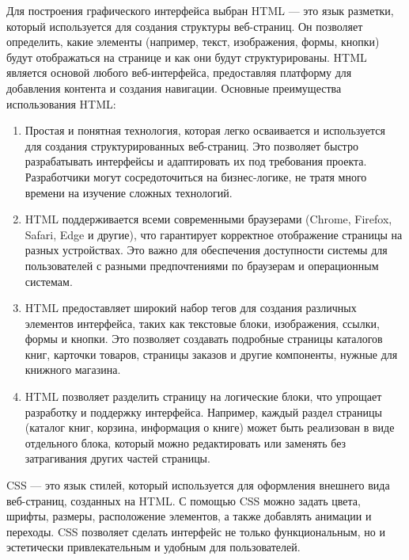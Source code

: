 Для построения графического интерфейса выбран HTML — это язык разметки, который используется для создания структуры веб-страниц. Он позволяет определить, какие элементы (например, текст, изображения, формы, кнопки) будут отображаться на странице и как они будут структурированы. HTML является основой любого веб-интерфейса, предоставляя платформу для добавления контента и создания навигации.
Основные преимущества использования HTML:
\begin{enumerate}
	\item Простая и понятная технология, которая легко осваивается и используется для создания структурированных веб-страниц. Это позволяет быстро разрабатывать интерфейсы и адаптировать их под требования проекта. Разработчики могут сосредоточиться на бизнес-логике, не тратя много времени на изучение сложных технологий.
	\item HTML поддерживается всеми современными браузерами (Chrome, Firefox, Safari, Edge и другие), что гарантирует корректное отображение страницы на разных устройствах. Это важно для обеспечения доступности системы для пользователей с разными предпочтениями по браузерам и операционным системам.
	\item HTML предоставляет широкий набор тегов для создания различных элементов интерфейса, таких как текстовые блоки, изображения, ссылки, формы и кнопки. Это позволяет создавать подробные страницы каталогов книг, карточки товаров, страницы заказов и другие компоненты, нужные для книжного магазина.
	\item HTML позволяет разделить страницу на логические блоки, что упрощает разработку и поддержку интерфейса. Например, каждый раздел страницы (каталог книг, корзина, информация о книге) может быть реализован в виде отдельного блока, который можно редактировать или заменять без затрагивания других частей страницы.
\end{enumerate}

CSS — это язык стилей, который используется для оформления внешнего вида веб-страниц, созданных на HTML. С помощью CSS можно задать цвета, шрифты, размеры, расположение элементов, а также добавлять анимации и переходы. CSS позволяет сделать интерфейс не только функциональным, но и эстетически привлекательным и удобным для пользователей.

